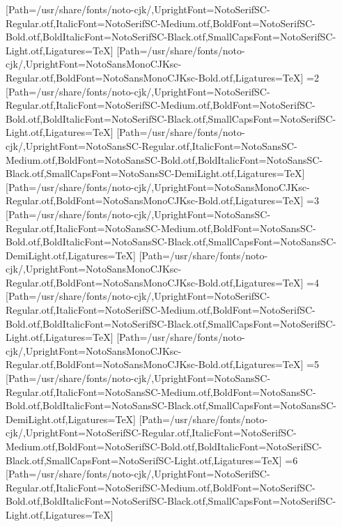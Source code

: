 [Path=/usr/share/fonts/noto-cjk/,UprightFont=NotoSerifSC-Regular.otf,ItalicFont=NotoSerifSC-Medium.otf,BoldFont=NotoSerifSC-Bold.otf,BoldItalicFont=NotoSerifSC-Black.otf,SmallCapsFont=NotoSerifSC-Light.otf,Ligatures=TeX]
[Path=/usr/share/fonts/noto-cjk/,UprightFont=NotoSansMonoCJKsc-Regular.otf,BoldFont=NotoSansMonoCJKsc-Bold.otf,Ligatures=TeX]
\else\ifnum\value{CJKFonts}=2
[Path=/usr/share/fonts/noto-cjk/,UprightFont=NotoSerifSC-Regular.otf,ItalicFont=NotoSerifSC-Medium.otf,BoldFont=NotoSerifSC-Bold.otf,BoldItalicFont=NotoSerifSC-Black.otf,SmallCapsFont=NotoSerifSC-Light.otf,Ligatures=TeX]
[Path=/usr/share/fonts/noto-cjk/,UprightFont=NotoSansSC-Regular.otf,ItalicFont=NotoSansSC-Medium.otf,BoldFont=NotoSansSC-Bold.otf,BoldItalicFont=NotoSansSC-Black.otf,SmallCapsFont=NotoSansSC-DemiLight.otf,Ligatures=TeX]
[Path=/usr/share/fonts/noto-cjk/,UprightFont=NotoSansMonoCJKsc-Regular.otf,BoldFont=NotoSansMonoCJKsc-Bold.otf,Ligatures=TeX]
\else\ifnum\value{CJKFonts}=3
[Path=/usr/share/fonts/noto-cjk/,UprightFont=NotoSansSC-Regular.otf,ItalicFont=NotoSansSC-Medium.otf,BoldFont=NotoSansSC-Bold.otf,BoldItalicFont=NotoSansSC-Black.otf,SmallCapsFont=NotoSansSC-DemiLight.otf,Ligatures=TeX]
[Path=/usr/share/fonts/noto-cjk/,UprightFont=NotoSansMonoCJKsc-Regular.otf,BoldFont=NotoSansMonoCJKsc-Bold.otf,Ligatures=TeX]
\else\ifnum\value{CJKFonts}=4
[Path=/usr/share/fonts/noto-cjk/,UprightFont=NotoSerifSC-Regular.otf,ItalicFont=NotoSerifSC-Medium.otf,BoldFont=NotoSerifSC-Bold.otf,BoldItalicFont=NotoSerifSC-Black.otf,SmallCapsFont=NotoSerifSC-Light.otf,Ligatures=TeX]
[Path=/usr/share/fonts/noto-cjk/,UprightFont=NotoSansMonoCJKsc-Regular.otf,BoldFont=NotoSansMonoCJKsc-Bold.otf,Ligatures=TeX]
\else\ifnum\value{CJKFonts}=5
[Path=/usr/share/fonts/noto-cjk/,UprightFont=NotoSansSC-Regular.otf,ItalicFont=NotoSansSC-Medium.otf,BoldFont=NotoSansSC-Bold.otf,BoldItalicFont=NotoSansSC-Black.otf,SmallCapsFont=NotoSansSC-DemiLight.otf,Ligatures=TeX]
[Path=/usr/share/fonts/noto-cjk/,UprightFont=NotoSerifSC-Regular.otf,ItalicFont=NotoSerifSC-Medium.otf,BoldFont=NotoSerifSC-Bold.otf,BoldItalicFont=NotoSerifSC-Black.otf,SmallCapsFont=NotoSerifSC-Light.otf,Ligatures=TeX]
\else\ifnum\value{CJKFonts}=6
[Path=/usr/share/fonts/noto-cjk/,UprightFont=NotoSerifSC-Regular.otf,ItalicFont=NotoSerifSC-Medium.otf,BoldFont=NotoSerifSC-Bold.otf,BoldItalicFont=NotoSerifSC-Black.otf,SmallCapsFont=NotoSerifSC-Light.otf,Ligatures=TeX]
